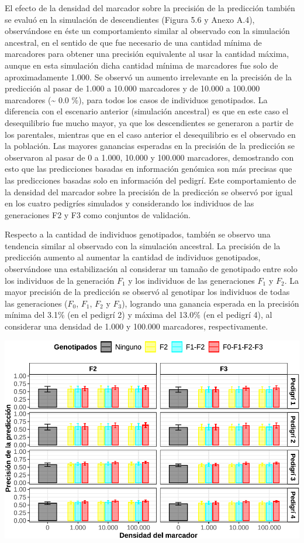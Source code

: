 \documentclass[11pt,spanish,a4paper,oneside,]{book} %
\begin{document}
El efecto de la densidad del marcador sobre la precisión de la predicción también se evaluó en la simulación de descendientes (Figura 5.6 y Anexo A.4), observándose en éste un comportamiento similar al observado con la simulación ancestral, en el sentido de que fue necesario de una cantidad mínima de marcadores para obtener una precisión equivalente al usar la cantidad máxima, aunque en esta simulación dicha cantidad mínima de marcadores fue solo de aproximadamente 1.000. Se observó un aumento irrelevante en la precisión de la predicción al pasar de 1.000 a 10.000 marcadores y de 10.000 a 100.000 marcadores (\textasciitilde{} 0.0 \%), para todos los casos de individuos genotipados. La diferencia con el escenario anterior (simulación ancestral) es que en este caso el desequilibrio fue mucho mayor, ya que los descendientes se generaron a partir de los parentales, mientras que en el caso anterior el desequilibrio es el observado en la población. Las mayores ganancias esperadas en la precisión de la predicción se observaron al pasar de 0 a 1.000, 10.000 y 100.000 marcadores, demostrando con esto que las predicciones basadas en información genómica son más precisas que las predicciones basadas solo en información del pedigrí. Este comportamiento de la densidad del marcador sobre la precisión de la predicción se observó por igual en los cuatro pedigríes simulados y considerando los individuos de las generaciones F2 y F3 como conjuntos de validación.

Respecto a la cantidad de individuos genotipados, también se observo una tendencia similar al observado con la simulación ancestral. La precisión de la predicción aumento al aumentar la cantidad de individuos genotipados, observándose una estabilización al considerar un tamaño de genotipado entre solo los individuos de la generación \(F_{1}\) y los individuos de las generaciones \(F_{1}\) y \(F_{2}\). La mayor precisión de la predicción se observó al genotipar los individuos de todas las generaciones (\(F_{0}\), \(F_{1}\), \(F_{2}\) y \(F_{3}\)), logrando una ganancia esperada en la precisión mínima del 3.1\% (en el pedigrí 2) y máxima del 13.0\% (en el pedigrí 4), al considerar una densidad de 1.000 y 100.000 marcadores, respectivamente.

\begin{center}\includegraphics[width=1\linewidth]{figures/Cor_F2_F3} \end{center}
\end{document}
